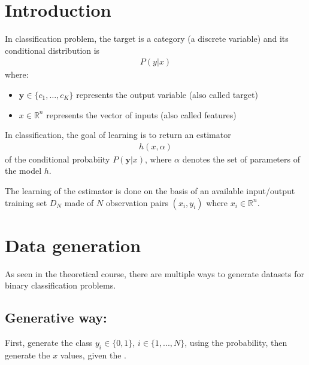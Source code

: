 \documentclass[letterpaper,10pt,english]{jupyterBook}
\begin{document}
\section{Introduction}
\label{\detokenize{06:introduction}}
\sphinxAtStartPar
In classification problem, the target is a category (a discrete variable) and its conditional distribution is
\begin{equation*}
\begin{split}P({y}|x)\end{split}
\end{equation*}
\sphinxAtStartPar
where:
\begin{itemize}
\item {} 
\sphinxAtStartPar
\(\mathbf{y} \in \{ c_1,\dots, c_K\}\) represents the output variable (also called target)

\item {} 
\sphinxAtStartPar
\(x \in \mathbb{R}^n\) represents the vector of inputs (also called features)

\end{itemize}

\sphinxAtStartPar
In classification, the goal of learning is to return an estimator
\begin{equation*}
\begin{split}h(x,\alpha)\end{split}
\end{equation*}
\sphinxAtStartPar
of the conditional probabiity \(P({\mathbf y}|x)\), where \(\alpha\) denotes the set of parameters of the model \(h\).

\sphinxAtStartPar
The learning of the estimator is done  on the basis of an available input/output
training set \(D_N\) made of \(N\) observation pairs \((x_i,y_i)\) where \(x_i \in \mathbb{R}^n\).


\section{Data generation}
\label{\detokenize{06:data-generation}}
\sphinxAtStartPar
As seen in the theoretical course, there are multiple ways to generate datasets for binary classification problems.


\subsection{Generative way:}
\label{\detokenize{06:generative-way}}
\sphinxAtStartPar
First, generate the class \(y_i \in \{0, 1\}\), \(i \in \{1,...,N\}\), using the  probability, then generate the \(x\) values, given the .
\end{document}
